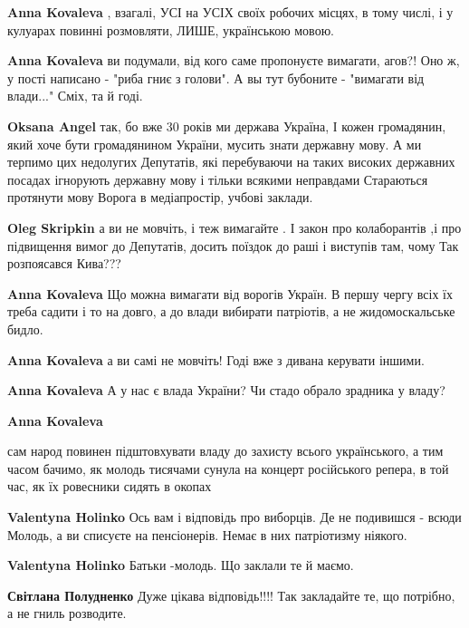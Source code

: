 \begin{itemize}
\begin{itemize} %
\textbf{Anna Kovaleva} , взагалі, УСІ на УСІХ своїх робочих місцях, в тому числі, і у кулуарах повинні розмовляти, ЛИШЕ, українською мовою.

\textbf{Anna Kovaleva} ви подумали, від кого саме пропонуєте вимагати, агов?!
Оно ж, у пості написано - "риба гниє з голови". А вы тут бубоните - "вимагати від влади..." Сміх, та й годі.

\textbf{Oksana Angel} так, бо вже 30 років ми держава Україна,
І кожен громадянин, який хоче бути громадянином України, мусить знати державну мову.
А ми терпимо цих недолугих
Депутатів, які перебуваючи на таких високих державних посадах ігнорують державну мову і тільки всякими неправдами
Стараються протянути мову
Ворога в медіапростір, учбові заклади.

\textbf{Oleg Skripkin} а ви не мовчіть, і теж вимагайте .
І закон про колаборантів ,і про підвищення вимог до
Депутатів, досить поїздок до раші і виступів там, чому
Так розпоясався Кива???

\textbf{Anna Kovaleva} Що можна вимагати від ворогів Україн.
В першу чергу всіх їх треба садити і то на довго, а до влади вибирати патріотів, а не жидомоскальське бидло.

\textbf{Anna Kovaleva} а ви самі не мовчіть! Годі вже з дивана керувати іншими.

\textbf{Anna Kovaleva} А у нас є влада України? Чи стадо обрало зрадника у владу?

\textbf{Anna Kovaleva} 

сам народ повинен підштовхувати владу до захисту всього українського, а тим
часом бачимо, як молодь тисячами сунула на концерт російського репера, в той
час, як їх ровесники сидять в окопах

\textbf{Valentyna Holinko} Ось вам і відповідь про виборців. Де не подивишся - всюди Молодь, а ви списуєте на пенсіонерів. Немає в них патріотизму ніякого.

\textbf{Valentyna Holinko} Батьки -молодь. Що заклали те й маємо.

\textbf{Світлана Полудненко} Дуже цікава відповідь!!!! Так закладайте те, що потрібно, а не гниль розводите.
\end{itemize} %


\end{itemize}
